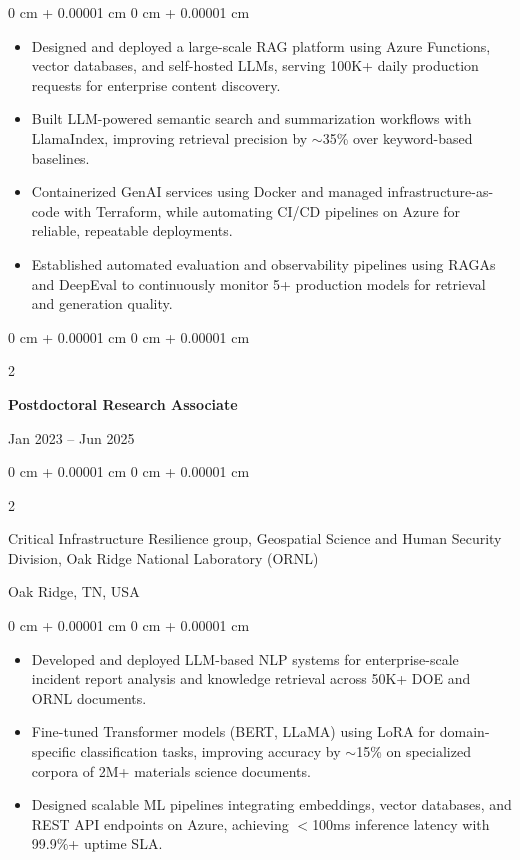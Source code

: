 \documentclass[10pt, letterpaper]{article}
\newenvironment{highlights}{
    \begin{itemize}[
        topsep=0.10 cm,
        parsep=0.10 cm,
        partopsep=0pt,
        itemsep=0pt,
        leftmargin=0 cm + 10pt
    ]
}{
    \end{itemize}
} %
\newenvironment{onecolentry}{
    \begin{adjustwidth}{
        0 cm + 0.00001 cm
    }{
        0 cm + 0.00001 cm
    }
}{
    \end{adjustwidth}
} %
\newenvironment{twocolentry}[2][]{
    \onecolentry
    \def\secondColumn{#2}
    \setcolumnwidth{\fill, 4.5 cm}
    \begin{paracol}{2}
}{
    \switchcolumn \raggedleft \secondColumn
    \end{paracol}
    \endonecolentry
} %
\begin{document}
    \begin{onecolentry}
        \begin{highlights}
            \item Designed and deployed a large-scale RAG platform using Azure Functions, vector databases, and self-hosted LLMs, serving 100K+ daily production requests for enterprise content discovery.
            \item Built LLM-powered semantic search and summarization workflows with LlamaIndex, improving retrieval precision by $\sim$35\% over keyword-based baselines.
            \item Containerized GenAI services using Docker and managed infrastructure-as-code with Terraform, while automating CI/CD pipelines on Azure for reliable, repeatable deployments.
            \item Established automated evaluation and observability pipelines using RAGAs and DeepEval to continuously monitor 5+ production models for retrieval and generation quality.
        \end{highlights}
    \end{onecolentry}

\vspace{1mm}

    \begin{twocolentry}{Jan 2023 -- Jun 2025}
        \textbf{Postdoctoral Research Associate}
    \end{twocolentry}
    \begin{twocolentry}{Oak Ridge, TN, USA}
        Critical Infrastructure Resilience group, Geospatial Science and Human Security Division, Oak Ridge National Laboratory (ORNL)
    \end{twocolentry}
    \vspace{0.10 cm}
    \begin{onecolentry}
        \begin{highlights}
            \item Developed and deployed LLM-based NLP systems for enterprise-scale incident report analysis and knowledge retrieval across 50K+ DOE and ORNL documents.
            \item Fine-tuned Transformer models (BERT, LLaMA) using LoRA for domain-specific classification tasks, improving accuracy by $\sim$15\% on specialized corpora of 2M+ materials science documents.
            \item Designed scalable ML pipelines integrating embeddings, vector databases, and REST API endpoints on Azure, achieving $<$100ms inference latency with 99.9\%+ uptime SLA.
        \end{highlights}
    \end{onecolentry}
\end{document}
